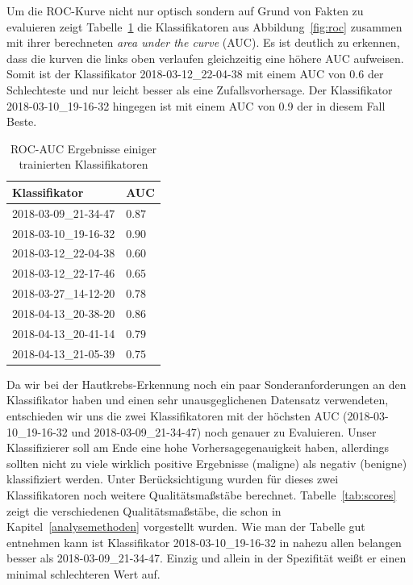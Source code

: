 Um die ROC-Kurve nicht nur optisch sondern auf Grund von Fakten zu evaluieren zeigt Tabelle~\ref{tab:auc} die Klassifikatoren aus Abbildung~\ref{fig:roc} zusammen mit ihrer berechneten \textit{area under the curve} (AUC). Es ist deutlich zu erkennen, dass die kurven die links oben verlaufen gleichzeitig eine höhere AUC aufweisen. Somit ist der Klassifikator 2018-03-12\_22-04-38 mit einem AUC von $0.6$ der Schlechteste und nur leicht besser als eine Zufallsvorhersage. Der Klassifikator 2018-03-10\_19-16-32 hingegen ist mit einem AUC von 0.9 der in diesem Fall Beste. 

\begin{table}[htb!]
\begin{center}
\begin{tabular}{ll}
	\toprule
 	Klassifikator  & AUC\\
	\midrule
  	2018-03-09\_21-34-47 &   $0.87$\\
    2018-03-10\_19-16-32 &   $0.90$\\
    2018-03-12\_22-04-38 &   $0.60$\\
    2018-03-12\_22-17-46 &   $0.65$\\
    2018-03-27\_14-12-20 &   $0.78$\\
    2018-04-13\_20-38-20 &   $0.86$\\
    2018-04-13\_20-41-14 &   $0.79$\\
    2018-04-13\_21-05-39 &   $0.75$\\
 \bottomrule
 \end{tabular}
 \end{center}
  \caption{ROC-AUC Ergebnisse einiger trainierten Klassifikatoren}
 \label{tab:auc}
 \end{table}
 
Da wir bei der Hautkrebs-Erkennung noch ein paar Sonderanforderungen an den Klassifikator haben und einen sehr unausgeglichenen Datensatz verwendeten, entschieden wir uns die zwei Klassifikatoren mit der höchsten AUC (2018-03-10\_19-16-32 und 2018-03-09\_21-34-47) noch genauer zu Evaluieren. Unser Klassifizierer soll am Ende  eine hohe Vorhersagegenauigkeit haben, allerdings sollten nicht zu viele wirklich positive Ergebnisse (maligne) als negativ (benigne) klassifiziert werden. Unter Berücksichtigung wurden für dieses zwei Klassifikatoren noch weitere Qualitätsmaßstäbe berechnet. Tabelle~\ref{tab:scores} zeigt die verschiedenen Qualitätsmaßstäbe,  die schon in Kapitel~\ref{analysemethoden} vorgestellt wurden. Wie man der Tabelle gut entnehmen kann ist Klassifikator 2018-03-10\_19-16-32 in nahezu allen belangen besser als 2018-03-09\_21-34-47. Einzig und allein in der Spezifität weißt er einen minimal schlechteren Wert auf.

